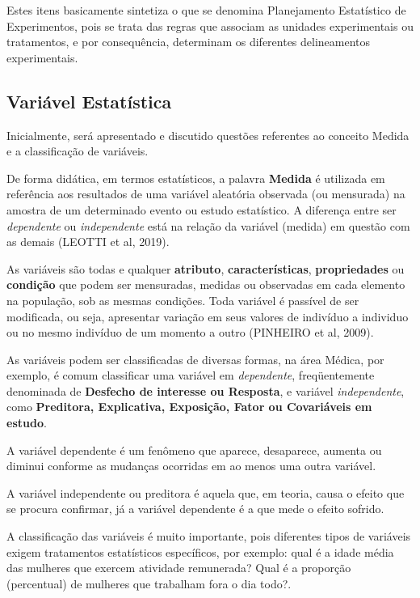 Estes itens basicamente sintetiza o que se denomina Planejamento Estatístico de Experimentos, pois se trata das regras que associam as unidades experimentais ou tratamentos, e por consequência, determinam os diferentes delineamentos experimentais.   

\subsection{Variável Estatística}

Inicialmente, será apresentado e discutido questões referentes ao conceito Medida e a classificação de variáveis.\vskip0.3cm

De forma didática, em termos estatísticos, a palavra \textbf{Medida} é utilizada em referência aos resultados de uma variável aleatória observada (ou mensurada) na amostra de um determinado evento ou estudo estatístico. A diferença entre ser \textit{dependente} ou \textit{independente} está na relação da variável (medida) em questão com as demais (LEOTTI et al, 2019).\vskip0.3cm

As variáveis são todas e qualquer \textbf{atributo}, \textbf{características}, \textbf{propriedades} ou \textbf{condição} que podem ser mensuradas, medidas ou observadas em cada elemento na população, sob as mesmas condições. Toda variável é passível de ser modificada, ou seja, apresentar variação em seus valores de indivíduo a individuo ou no mesmo indivíduo de um momento a outro (PINHEIRO et al, 2009).\vskip0.3cm 

As variáveis podem ser classificadas de diversas formas, na área Médica, por exemplo, é comum classificar uma variável em \textit{dependente}, freqüentemente denominada de \textbf{Desfecho de interesse ou Resposta}, e variável \textit{independente}, como \textbf{Preditora, Explicativa, Exposição, Fator ou Covariáveis em estudo}. 

\newpage
A variável dependente é um fenômeno que aparece, desaparece, aumenta ou diminui conforme as mudanças ocorridas em ao menos uma outra variável.\vskip0.3cm 

A variável independente ou preditora é aquela que, em teoria, causa o efeito que se procura confirmar, já a variável dependente é a que mede o efeito sofrido.\vskip0.3cm

A classificação das variáveis é muito importante, pois diferentes tipos de variáveis exigem tratamentos estatísticos específicos, por exemplo: qual é a idade média das mulheres que exercem atividade remunerada? Qual é a proporção (percentual) de mulheres que trabalham fora o dia todo?.\vskip0.3cm

